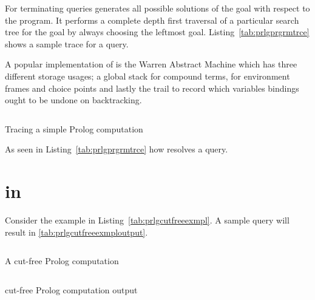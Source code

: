 \documentclass[thesis-solanki.tex]{subfiles}
\begin{document}
For terminating queries  generates all possible solutions of the goal with respect to the
 program.
It performs a complete depth first traversal of a particular search tree for the goal by always choosing the
leftmost goal.
Listing~\ref{tab:prlgprgrmtrce} shows a sample trace for a query.

A popular implementation of  is the Warren Abstract Machine \cite{ait1999warren} which has three
different storage usages; a global stack for compound terms, for environment frames and choice points and lastly
the trail to record which variables bindings ought to be undone on backtracking.

\begin{code-list}[H]
  \begin{singlespace}
    \inputminted[linenos]{prolog}{prologprogramtrace.pl}
  \end{singlespace}
  \caption{Tracing a simple Prolog computation \cite{Sterling:1994:APA:175753}}
\label{tab:prlgprgrmtrce}
\end{code-list}

As seen in Listing~\ref{tab:prlgprgrmtrce} how  resolves a query. 

\section{ in }
Consider the example in Listing~\ref{tab:prlgcutfreeexmpl}.
A sample query  will result in \ref{tab:prlgcutfreeexmploutput}. 

\begin{code-list}[H]
  \begin{singlespace}
    \inputminted[linenos]{prolog}{prlgcutfreeexmpl.pl}
  \end{singlespace}
  \caption{A cut-free Prolog computation \cite{website:cutprologunionedu}}
\label{tab:prlgcutfreeexmpl}
\end{code-list}

\begin{code-list}[H]
  \begin{singlespace}
    \inputminted[linenos]{prolog}{prlgcutfreeexmploutput.pl}
  \end{singlespace}
  \caption{cut-free Prolog computation output\cite{website:cutprologunionedu}}
\label{tab:prlgcutfreeexmploutput}
\end{code-list}
\end{document}
